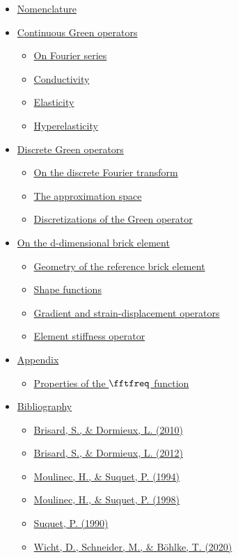 \documentclass[oneside]{memoir}
\begin{document}
\begin{itemize}
\item \hyperlink{12321510312768487985}{Nomenclature}
\item \hyperlink{13734652986780424843}{Continuous Green operators}
\begin{itemize}
\item \hyperlink{11901743907716800672}{On Fourier series}
\item \hyperlink{6549129120501784746}{Conductivity}
\item \hyperlink{10340496927750756388}{Elasticity}
\item \hyperlink{16861761838597320957}{Hyperelasticity}
\end{itemize}
\item \hyperlink{1050018100428169985}{Discrete Green operators}
\begin{itemize}
\item \hyperlink{5250349235821641230}{On the discrete Fourier transform}
\item \hyperlink{3470771881996884583}{The approximation space}
\item \hyperlink{11094457950407373392}{Discretizations of the Green operator}
\end{itemize}
\item \hyperlink{17831501573587717000}{On the d-dimensional brick element}
\begin{itemize}
\item \hyperlink{10162273478024495150}{Geometry of the reference brick element}
\item \hyperlink{17125853350239781481}{Shape functions}
\item \hyperlink{2492262002713312068}{Gradient and strain-displacement operators}
\item \hyperlink{15811403169534872275}{Element stiffness operator}
\end{itemize}
\item \hyperlink{2489772129592300935}{Appendix}
\begin{itemize}
\item \hyperlink{18289269374885937903}{Properties of the \(\fftfreq\) function}
\end{itemize}
\item \hyperlink{7261367053393854382}{Bibliography}
\begin{itemize}
\item \hyperlink{16002782079292950992}{Brisard, S., \& Dormieux, L. (2010)}
\item \hyperlink{17627112247925688930}{Brisard, S., \& Dormieux, L. (2012)}
\item \hyperlink{8653883748112457965}{Moulinec, H., \& Suquet, P. (1994)}
\item \hyperlink{9534833447558490031}{Moulinec, H., \& Suquet, P. (1998)}
\item \hyperlink{15745057744408808743}{Suquet, P. (1990)}
\item \hyperlink{10620780704054356859}{Wicht, D., Schneider, M., \& Böhlke, T. (2020)}
\end{itemize}
\end{itemize}
\end{document}
